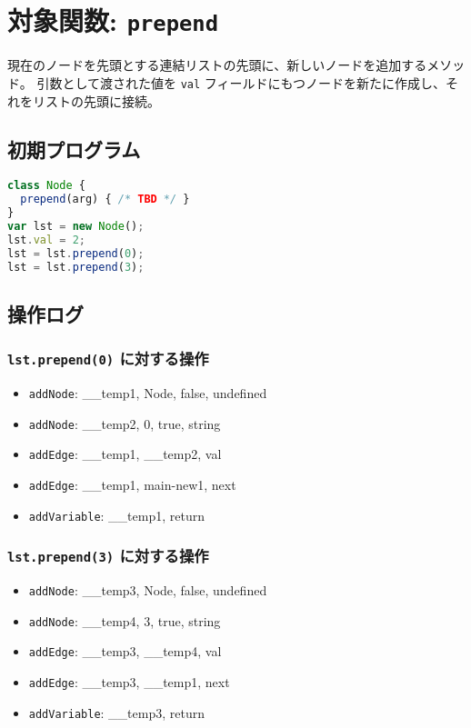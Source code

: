 \documentclass{article}
\begin{document}

\section{対象関数: \texttt{prepend}}
現在のノードを先頭とする連結リストの先頭に、新しいノードを追加するメソッド。
引数として渡された値を \texttt{val} フィールドにもつノードを新たに作成し、それをリストの先頭に接続。

\subsection{初期プログラム}

\begin{lstlisting}[language=JavaScript]
class Node {
  prepend(arg) { /* TBD */ }
}
var lst = new Node(); 
lst.val = 2;
lst = lst.prepend(0);
lst = lst.prepend(3);
\end{lstlisting}

\subsection{操作ログ}

\subsubsection{\texttt{lst.prepend(0)} に対する操作}
\begin{itemize}
  \item \texttt{addNode}: \_\_temp1, Node, false, undefined
  \item \texttt{addNode}: \_\_temp2, 0, true, string
  \item \texttt{addEdge}: \_\_temp1, \_\_temp2, val
  \item \texttt{addEdge}: \_\_temp1, main-new1, next
  \item \texttt{addVariable}: \_\_temp1, return
\end{itemize}

\subsubsection{\texttt{lst.prepend(3)} に対する操作}
\begin{itemize}
  \item \texttt{addNode}: \_\_temp3, Node, false, undefined
  \item \texttt{addNode}: \_\_temp4, 3, true, string
  \item \texttt{addEdge}: \_\_temp3, \_\_temp4, val
  \item \texttt{addEdge}: \_\_temp3, \_\_temp1, next
  \item \texttt{addVariable}: \_\_temp3, return
\end{itemize}
\end{document}
